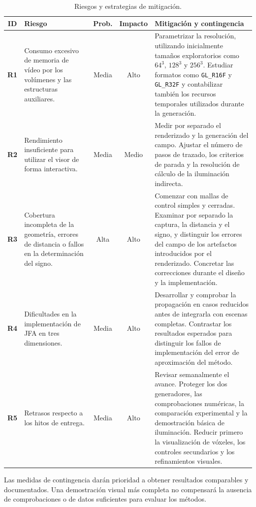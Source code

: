 \begin{table}[htbp]
  \centering
  \small
  \caption{Riesgos y estrategias de mitigación.}
  \label{tab:riesgos}
  \begin{tabularx}{\textwidth}{|>{\bfseries}c|>{\raggedright\arraybackslash}p{38mm}|c|c|>{\raggedright\arraybackslash}X|}
    \hline
    \rowcolor{tablegray} ID & Riesgo & Prob. & Impacto & Mitigación y contingencia \\ \hline
    R1 & Consumo excesivo de memoria de vídeo por los volúmenes y las estructuras auxiliares. & Media & Alto & Parametrizar la resolución, utilizando inicialmente tamaños exploratorios como $64^3$, $128^3$ y $256^3$. Estudiar formatos como \texttt{GL\_R16F} y \texttt{GL\_R32F} y contabilizar también los recursos temporales utilizados durante la generación. \\ \hline
    R2 & Rendimiento insuficiente para utilizar el visor de forma interactiva. & Media & Medio & Medir por separado el renderizado y la generación del campo. Ajustar el número de pasos de trazado, los criterios de parada y la resolución de cálculo de la iluminación indirecta. \\ \hline
    R3 & Cobertura incompleta de la geometría, errores de distancia o fallos en la determinación del signo. & Alta & Alto & Comenzar con mallas de control simples y cerradas. Examinar por separado la captura, la distancia y el signo, y distinguir los errores del campo de los artefactos introducidos por el renderizado. Concretar las correcciones durante el diseño y la implementación. \\ \hline
    R4 & Dificultades en la implementación de JFA en tres dimensiones. & Media & Alto & Desarrollar y comprobar la propagación en casos reducidos antes de integrarla con escenas completas. Contrastar los resultados esperados para distinguir los fallos de implementación del error de aproximación del método. \\ \hline
    R5 & Retrasos respecto a los hitos de entrega. & Media & Alto & Revisar semanalmente el avance. Proteger los dos generadores, las comprobaciones numéricas, la comparación experimental y la demostración básica de iluminación. Reducir primero la visualización de vóxeles, los controles secundarios y los refinamientos visuales. \\ \hline
  \end{tabularx}
\end{table}

Las medidas de contingencia darán prioridad a obtener resultados comparables y documentados. Una demostración visual más completa no compensará la ausencia de comprobaciones o de datos suficientes para evaluar los métodos.

